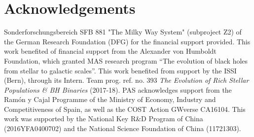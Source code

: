 \documentclass[twocolumn]{aastex62}
\begin{document}
\section*{Acknowledgements}

Sonderforschungsbereich SFB 881 "The Milky Way System" (subproject Z2) of the
German Research Foundation (DFG) for the financial support provided. This work
benefited of financial support from the Alexander von Humboldt Foundation,
which granted MAS research program ``The evolution of black holes from stellar
to galactic scales''.  This work benefited from support by the ISSI (Bern),
through its Intern. Team prog. ref. no. 393 {\it The Evolution of Rich Stellar
Populations \& BH Binaries} (2017-18).  PAS acknowledges support from the
Ram{\'o}n y Cajal Programme of the Ministry of Economy, Industry and
Competitiveness of Spain, as well as the COST Action GWverse CA16104. This work
was supported by the National Key R\&D Program of China (2016YFA0400702) and
the National Science Foundation of China (11721303).

\footnotesize{


}
\end{document}
